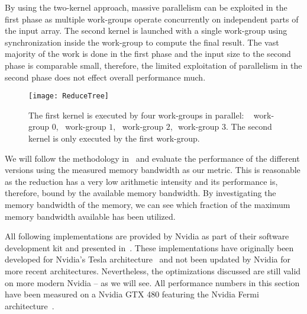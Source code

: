 By using the two-kernel approach, massive parallelism can be exploited in the first phase as multiple work-groups operate concurrently on independent parts of the input array.
The second kernel is launched with a single work-group using synchronization inside the work-group to compute the final result.
The vast majority of the work is done in the first phase and the input size to the second phase is comparable small, therefore, the limited exploitation of parallelism in the second phase does not effect overall performance much.

\begin{figure}[t]
  \centering
  \texttt{[image: ReduceTree]}
  \caption[Parallel Reduction in \OpenCL.]%
    {The first \OpenCL kernel is executed by four work-groups in parallel:
    \ \protect\firstBox{}\,\,work-group $0$,\ \protect\secondBox{}\,\,work-group $1$,\ \protect\thirdBox{}\,\,work-group $2$, \protect\fourthBox{}\,\,work-group $3$.
           The second \OpenCL kernel is only executed by the first work-group.}
  \label{fig:reduce:tree}
\end{figure}

We will follow the methodology in~\cite{Harris2007} and evaluate the performance of the different versions using the measured \GPU memory bandwidth as our metric.
This is reasonable as the reduction has a very low arithmetic intensity and its performance is, therefore, bound by the available \GPU memory bandwidth.
By investigating the memory bandwidth of the \GPU memory, we can see which fraction of the maximum memory bandwidth available has been utilized.

All following implementations are provided by Nvidia as part of their software development kit and presented in~\cite{Harris2007}.
These implementations have originally been developed for Nvidia's Tesla \GPU architecture~\cite{LindholmNOM2008} and not been updated by Nvidia for more recent \GPU architectures.
Nevertheless, the optimizations discussed are still valid on more modern Nvidia \GPUs -- as we will see.
All performance numbers in this section have been measured on a Nvidia GTX 480 \GPU featuring the Nvidia Fermi architecture~\cite{CUDAFermi2009}.

\newpage


